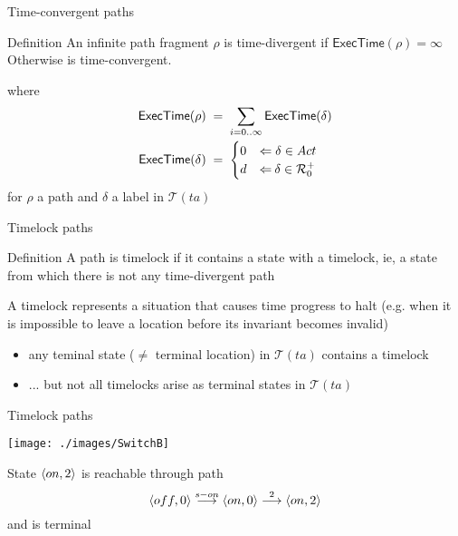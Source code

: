 \documentclass{beamer}
\def\dgold#1{{\darkgoldenrod #1}}
\def\dkb#1{{\blue #1}}
\def\R{\mathcal{R}}
\def\TL#1{\mathcal{T}(#1)}
\def\ET#1{\mathsf{ExecTime(#1)}}
\begin{document}
\begin{slide}{Time-convergent paths}
\small

\begin{block}{Definition}
An infinite path fragment $\rho$ is \dkb{time-divergent} if $\ET{\rho} = \infty$\\
Otherwise is  \dkb{time-convergent}. 
\end{block}

where
\begin{align*}
\ET{\rho}\; & =\; \sum_{i=0 .. \infty} \ET{\delta}\\
\ET{\delta}\; & =\; \begin{cases}
0 & \rimp\;  \delta \in Act\\
d & \rimp\:  \delta \in \R_0^+
\end{cases}
\end{align*}
for $\rho$ a path and $\delta$ a label in $\TL{ta}$ 
\end{slide}

\begin{slide}{Timelock paths}
\small

\begin{block}{Definition}
A path is \dkb{timelock} if it contains a state with a timelock, ie, a \dgold{state
from which there is not any time-divergent path}
\vspace{0.3cm}

A \dkb{timelock} represents a situation that causes time progress to halt (e.g. when it is impossible to leave a location before its invariant becomes invalid)
\end{block}

\begin{itemize}
\item any \dkb{teminal state} ($\neq$ terminal location) in $\TL{ta}$ contains a timelock
\item ... but not all timelocks arise as terminal states in $\TL{ta}$
\end{itemize}
\end{slide}



\begin{slide}{Timelock paths}
\small

\begin{center}
  \texttt{[image: ./images/SwitchB]} 
\end{center}

State $\mathopen{\langle}on,2\mathclose{\rangle}$ is reachable through path 
$$\mathopen{\langle}off,0\mathclose{\rangle} \stackrel{s-on}{\longrightarrow} \mathopen{\langle}on,0\mathclose{\rangle} \stackrel{2}{\longrightarrow} \mathopen{\langle}on,2\mathclose{\rangle}$$
and is terminal

\end{slide}
\end{document}

